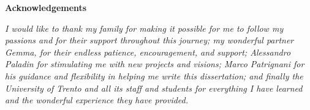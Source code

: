 \thispagestyle{empty}

\begin{center}
    {\bf \Huge Acknowledgements}
\end{center}

\vspace{4cm}

\emph{
    I would like to thank my family for making it possible for me to follow my passions and for their support throughout this journey;
    my wonderful partner Gemma, for their endless patience, encouragement, and support;
    Alessandro Paladin for stimulating me with new projects and visions;
    Marco Patrignani for his guidance and flexibility in helping me write this dissertation;
    and finally the University of Trento and all its staff and students for everything I have learned and the wonderful experience they have provided.
}
